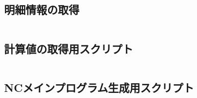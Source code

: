 






\subsection{明細情報の取得}

\inputminted{python}{../Created_Python_Scripts/subscripts/load_values.py}


\clearrightpage
\subsection{計算値の取得用スクリプト}

\inputminted{python}{../Created_Python_Scripts/subscripts/preample_for_d_main_prg.py}



\clearrightpage


\subsection{NCメインプログラム生成用スクリプト}

